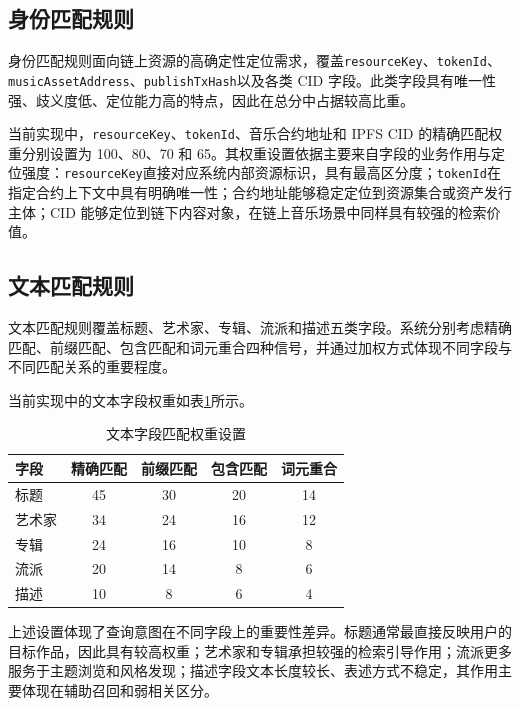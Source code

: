 \subsection{身份匹配规则}

身份匹配规则面向链上资源的高确定性定位需求，覆盖\texttt{resourceKey}、\texttt{tokenId}、\texttt{musicAssetAddress}、\texttt{publishTxHash}以及各类 CID 字段。此类字段具有唯一性强、歧义度低、定位能力高的特点，因此在总分中占据较高比重。

当前实现中，\texttt{resourceKey}、\texttt{tokenId}、音乐合约地址和 IPFS CID 的精确匹配权重分别设置为 100、80、70 和 65。其权重设置依据主要来自字段的业务作用与定位强度：\texttt{resourceKey}直接对应系统内部资源标识，具有最高区分度；\texttt{tokenId}在指定合约上下文中具有明确唯一性；合约地址能够稳定定位到资源集合或资产发行主体；CID 能够定位到链下内容对象，在链上音乐场景中同样具有较强的检索价值。

\subsection{文本匹配规则}

文本匹配规则覆盖标题、艺术家、专辑、流派和描述五类字段。系统分别考虑精确匹配、前缀匹配、包含匹配和词元重合四种信号，并通过加权方式体现不同字段与不同匹配关系的重要程度。

当前实现中的文本字段权重如表\ref{tab:text_matching_weights}所示。

\begin{table}[htbp]
    \linespread{1.5}
    \songti
    \centering
    \caption{文本字段匹配权重设置}\label{tab:text_matching_weights}
    \begin{tabular}{|l|c|c|c|c|}
        \hline
        字段  & 精确匹配 & 前缀匹配 & 包含匹配 & 词元重合 \\ \hline
        标题  & 45   & 30   & 20   & 14   \\ \hline
        艺术家 & 34   & 24   & 16   & 12   \\ \hline
        专辑  & 24   & 16   & 10   & 8    \\ \hline
        流派  & 20   & 14   & 8    & 6    \\ \hline
        描述  & 10   & 8    & 6    & 4    \\ \hline
    \end{tabular}
\end{table}

上述设置体现了查询意图在不同字段上的重要性差异。标题通常最直接反映用户的目标作品，因此具有较高权重；艺术家和专辑承担较强的检索引导作用；流派更多服务于主题浏览和风格发现；描述字段文本长度较长、表述方式不稳定，其作用主要体现在辅助召回和弱相关区分。

